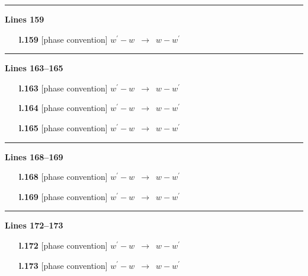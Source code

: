 \documentclass[10pt]{article}
\begin{document}
\noindent\rule{\linewidth}{0.3pt}\par\noindent\textbf{Lines 159} \par
\begin{itemize}[leftmargin=2.2em,itemsep=1pt,topsep=2pt]
\item[\textbf{l.159}] \textsf{\small [phase convention]} $\displaystyle w^{\prime}-w$\ $\longrightarrow$\ $\displaystyle w-w^{\prime}$
\end{itemize}
\noindent\rule{\linewidth}{0.3pt}\par\noindent\textbf{Lines 163--165} \par
\begin{itemize}[leftmargin=2.2em,itemsep=1pt,topsep=2pt]
\item[\textbf{l.163}] \textsf{\small [phase convention]} $\displaystyle w^{\prime}-w$\ $\longrightarrow$\ $\displaystyle w-w^{\prime}$
\item[\textbf{l.164}] \textsf{\small [phase convention]} $\displaystyle w^{\prime}-w$\ $\longrightarrow$\ $\displaystyle w-w^{\prime}$
\item[\textbf{l.165}] \textsf{\small [phase convention]} $\displaystyle w^{\prime}-w$\ $\longrightarrow$\ $\displaystyle w-w^{\prime}$
\end{itemize}
\noindent\rule{\linewidth}{0.3pt}\par\noindent\textbf{Lines 168--169} \par
\begin{itemize}[leftmargin=2.2em,itemsep=1pt,topsep=2pt]
\item[\textbf{l.168}] \textsf{\small [phase convention]} $\displaystyle w^{\prime}-w$\ $\longrightarrow$\ $\displaystyle w-w^{\prime}$
\item[\textbf{l.169}] \textsf{\small [phase convention]} $\displaystyle w^{\prime}-w$\ $\longrightarrow$\ $\displaystyle w-w^{\prime}$
\end{itemize}
\noindent\rule{\linewidth}{0.3pt}\par\noindent\textbf{Lines 172--173} \par
\begin{itemize}[leftmargin=2.2em,itemsep=1pt,topsep=2pt]
\item[\textbf{l.172}] \textsf{\small [phase convention]} $\displaystyle w^{\prime}-w$\ $\longrightarrow$\ $\displaystyle w-w^{\prime}$
\item[\textbf{l.173}] \textsf{\small [phase convention]} $\displaystyle w^{\prime}-w$\ $\longrightarrow$\ $\displaystyle w-w^{\prime}$
\end{itemize}
\end{document}
